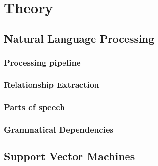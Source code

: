 \chapter{Theory}\label{chapter:theory}


\section{Natural Language Processing}

\subsection{Processing pipeline}\label{sec:NLPPipeline}

\subsection{Relationship Extraction}\label{sec:RE}

\subsection{Parts of speech}

\subsection{Grammatical Dependencies}

\section{Support Vector Machines}
